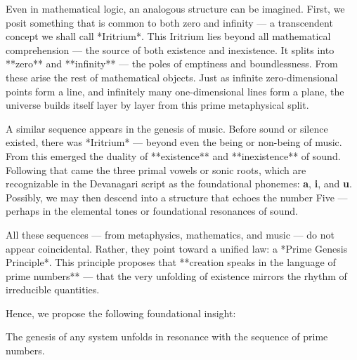 Even in mathematical logic, an analogous structure can be imagined. First, we posit something that is common to both zero and infinity — a transcendent concept we shall call *Iritrium*. This Iritrium lies beyond all mathematical comprehension — the source of both existence and inexistence. It splits into **zero** and **infinity** — the poles of emptiness and boundlessness. From these arise the rest of mathematical objects. Just as infinite zero-dimensional points form a line, and infinitely many one-dimensional lines form a plane, the universe builds itself layer by layer from this prime metaphysical split.

A similar sequence appears in the genesis of music. Before sound or silence existed, there was *Iritrium* — beyond even the being or non-being of music. From this emerged the duality of **existence** and **inexistence** of sound. Following that came the three primal vowels or sonic roots, which are recognizable in the Devanagari script as the foundational phonemes: \textbf{a}, \textbf{i}, and \textbf{u}. Possibly, we may then descend into a structure that echoes the number Five — perhaps in the elemental tones or foundational resonances of sound.

All these sequences — from metaphysics, mathematics, and music — do not appear coincidental. Rather, they point toward a unified law: a *Prime Genesis Principle*. This principle proposes that **creation speaks in the language of prime numbers** — that the very unfolding of existence mirrors the rhythm of irreducible quantities.

Hence, we propose the following foundational insight:

\begin{principle}
The genesis of any system unfolds in resonance with the sequence of prime numbers.
\end{principle}

